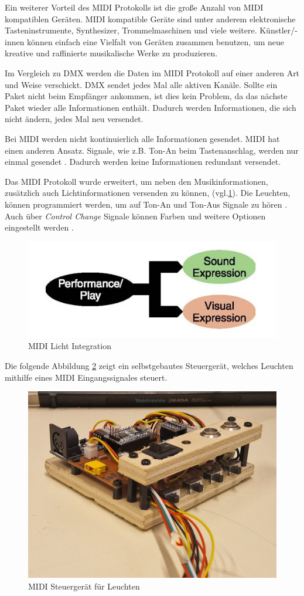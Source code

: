 Ein weiterer Vorteil des MIDI Protokolls ist die große Anzahl von MIDI kompatiblen Geräten. MIDI kompatible Geräte sind unter anderem elektronische Tasteninstrumente, Synthesizer, Trommelmaschinen und viele weitere. Künstler/-innen können einfach eine Vielfalt von Geräten zusammen benutzen, um neue kreative und raffinierte musikalische Werke zu produzieren.

Im Vergleich zu DMX werden die Daten im MIDI Protokoll auf einer anderen Art und Weise verschickt. DMX sendet jedes Mal alle aktiven Kanäle. Sollte ein Paket nicht beim Empfänger ankommen, ist dies kein Problem, da das nächste Paket wieder alle Informationen enthält. Dadurch werden Informationen, die sich nicht ändern, jedes Mal neu versendet.

Bei MIDI werden nicht kontinuierlich alle Informationen gesendet. MIDI hat einen anderen Ansatz. Signale, wie z.B. Ton-An beim Tastenanschlag, werden nur einmal gesendet \cite[S.3]{MIDI-DETAILED-SPECIFICATION}. Dadurch werden keine Informationen redundant versendet.

Das MIDI Protokoll wurde erweitert, um neben den Musikinformationen, zusätzlich auch Lichtinformationen versenden zu können, \cite[S.1]{MIDI-Visual-Control} (vgl.\ref{fig:Midi_Light_Integration}). Die Leuchten, können programmiert werden, um auf Ton-An und Ton-Aus Signale zu hören \cite[S.4]{MIDI-Visual-Control}. Auch über \emph{Control Change} Signale können Farben und weitere Optionen eingestellt werden \cite[S.6, ch. 2.2.1.2]{MIDI-Visual-Control}. 

\begin{figure}[H]
	\centering
	\includegraphics[width=.6\linewidth]{Pictures/MidiVisual}
	\caption{MIDI Licht Integration \cite[S. 1]{MIDI-Visual-Control}}
	\label{fig:Midi_Light_Integration}
\end{figure}

Die folgende Abbildung \ref{fig:MidiUseCase} zeigt ein selbstgebautes Steuergerät, welches Leuchten mithilfe eines MIDI Eingangssignales steuert.
\begin{figure}[H]
	\centering
	\includegraphics[width=.5\linewidth]{Pictures/midiUseCase}
	\caption{MIDI Steuergerät für Leuchten}
	\label{fig:MidiUseCase}
\end{figure}
 

